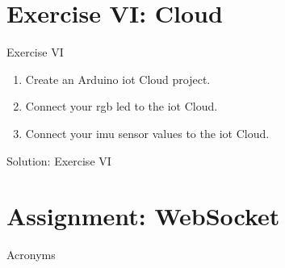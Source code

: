 \documentclass[aspectratio=169]{beamer}
\begin{document}
\section{Exercise VI:  Cloud}

\begin{frame}
    \begin{exampleblock}{Exercise VI}
        \begin{enumerate}
            \item Create an Arduino\textregistered{} \acs{iot} Cloud project.
            \item Connect your \acs{rgb} \acs{led} to the \acs{iot} Cloud.
            \item Connect your \acs{imu} sensor values to the \acs{iot} Cloud.
        \end{enumerate}
    \end{exampleblock}
\end{frame}

\begin{frame}{Solution: Exercise VI}
\end{frame}

\section{Assignment: WebSocket}

\appendix

\begin{frame}[allowframebreaks]{Acronyms}
    \printglossary[type=\acronymtype, nonumberlist]
\end{frame}

%     
\end{document}
